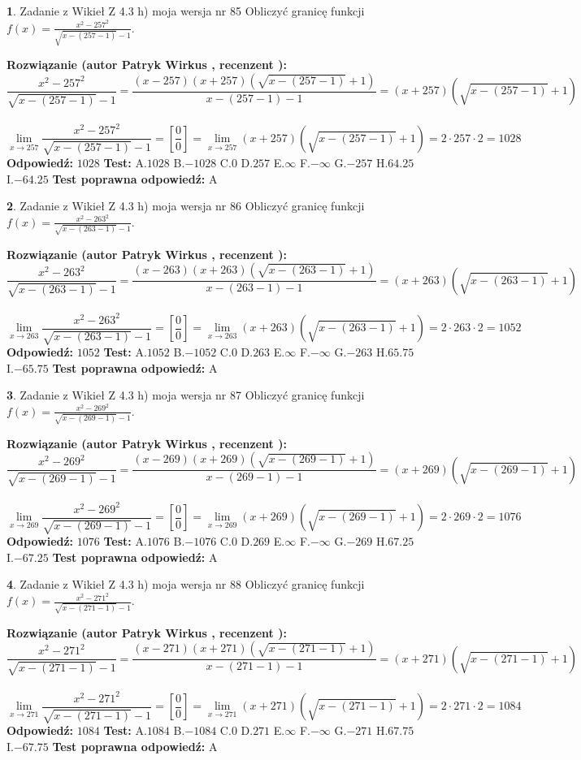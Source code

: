 \documentclass[12pt, a4paper]{article}
\theoremstyle{definition} %
\newtheorem{zad}{}
\newcommand{\zadStart}[1]{\begin{zad}#1\newline}
\newcommand{\zadStop}{\end{zad}}
\newcommand{\rozwStart}[2]{\noindent \textbf{Rozwiązanie (autor #1 , recenzent #2): }\newline}
\newcommand{\rozwStop}{\newline}
\newcommand{\odpStart}{\noindent \textbf{Odpowiedź:}\newline}
\newcommand{\odpStop}{\newline}
\newcommand{\testStart}{\noindent \textbf{Test:}\newline}
\newcommand{\testStop}{\newline}
\newcommand{\kluczStart}{\noindent \textbf{Test poprawna odpowiedź:}\newline}
\newcommand{\kluczStop}{\newline}
\begin{document}
\zadStart{Zadanie z Wikieł Z 4.3 h) moja wersja nr 85}
Obliczyć granicę funkcji $f(x)=\frac{x^{2} - 257^{2}}{\sqrt{x-(257-1)}-1}$.
\zadStop
\rozwStart{Patryk Wirkus}{}
$$\frac{x^{2} - 257^{2}}{\sqrt{x-(257-1)}-1}=\frac{(x-257)(x+257)(\sqrt{x-(257-1)}+1)}{x-(257-1)-1}=(x+257)(\sqrt{x-(257-1)}+1)$$
\\
$$\lim\limits_{x\to 257}\frac{x^{2} - 257^{2}}{\sqrt{x-(257-1)}-1}=[\frac{0}{0}]=
\lim\limits_{x\to 257}(x+257)(\sqrt{x-(257-1)}+1) = 2\cdot257 \cdot 2 = 1028$$
\rozwStop
\odpStart
$1028$
\odpStop
\testStart
A.$1028$
B.$-1028$
C.$0$
D.$257$
E.$\infty$
F.$-\infty$
G.$-257$
H.$64.25$
I.$-64.25$
\testStop
\kluczStart
A
\kluczStop



\zadStart{Zadanie z Wikieł Z 4.3 h) moja wersja nr 86}
Obliczyć granicę funkcji $f(x)=\frac{x^{2} - 263^{2}}{\sqrt{x-(263-1)}-1}$.
\zadStop
\rozwStart{Patryk Wirkus}{}
$$\frac{x^{2} - 263^{2}}{\sqrt{x-(263-1)}-1}=\frac{(x-263)(x+263)(\sqrt{x-(263-1)}+1)}{x-(263-1)-1}=(x+263)(\sqrt{x-(263-1)}+1)$$
\\
$$\lim\limits_{x\to 263}\frac{x^{2} - 263^{2}}{\sqrt{x-(263-1)}-1}=[\frac{0}{0}]=
\lim\limits_{x\to 263}(x+263)(\sqrt{x-(263-1)}+1) = 2\cdot263 \cdot 2 = 1052$$
\rozwStop
\odpStart
$1052$
\odpStop
\testStart
A.$1052$
B.$-1052$
C.$0$
D.$263$
E.$\infty$
F.$-\infty$
G.$-263$
H.$65.75$
I.$-65.75$
\testStop
\kluczStart
A
\kluczStop



\zadStart{Zadanie z Wikieł Z 4.3 h) moja wersja nr 87}
Obliczyć granicę funkcji $f(x)=\frac{x^{2} - 269^{2}}{\sqrt{x-(269-1)}-1}$.
\zadStop
\rozwStart{Patryk Wirkus}{}
$$\frac{x^{2} - 269^{2}}{\sqrt{x-(269-1)}-1}=\frac{(x-269)(x+269)(\sqrt{x-(269-1)}+1)}{x-(269-1)-1}=(x+269)(\sqrt{x-(269-1)}+1)$$
\\
$$\lim\limits_{x\to 269}\frac{x^{2} - 269^{2}}{\sqrt{x-(269-1)}-1}=[\frac{0}{0}]=
\lim\limits_{x\to 269}(x+269)(\sqrt{x-(269-1)}+1) = 2\cdot269 \cdot 2 = 1076$$
\rozwStop
\odpStart
$1076$
\odpStop
\testStart
A.$1076$
B.$-1076$
C.$0$
D.$269$
E.$\infty$
F.$-\infty$
G.$-269$
H.$67.25$
I.$-67.25$
\testStop
\kluczStart
A
\kluczStop



\zadStart{Zadanie z Wikieł Z 4.3 h) moja wersja nr 88}
Obliczyć granicę funkcji $f(x)=\frac{x^{2} - 271^{2}}{\sqrt{x-(271-1)}-1}$.
\zadStop
\rozwStart{Patryk Wirkus}{}
$$\frac{x^{2} - 271^{2}}{\sqrt{x-(271-1)}-1}=\frac{(x-271)(x+271)(\sqrt{x-(271-1)}+1)}{x-(271-1)-1}=(x+271)(\sqrt{x-(271-1)}+1)$$
\\
$$\lim\limits_{x\to 271}\frac{x^{2} - 271^{2}}{\sqrt{x-(271-1)}-1}=[\frac{0}{0}]=
\lim\limits_{x\to 271}(x+271)(\sqrt{x-(271-1)}+1) = 2\cdot271 \cdot 2 = 1084$$
\rozwStop
\odpStart
$1084$
\odpStop
\testStart
A.$1084$
B.$-1084$
C.$0$
D.$271$
E.$\infty$
F.$-\infty$
G.$-271$
H.$67.75$
I.$-67.75$
\testStop
\kluczStart
A
\kluczStop
\end{document}

